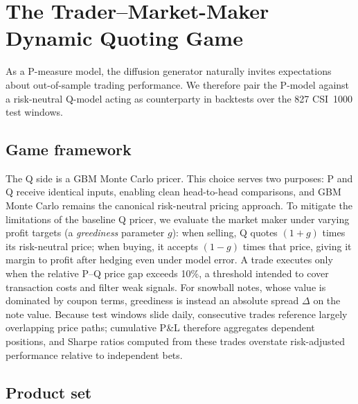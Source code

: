 \documentclass[12pt,letterpaper]{article}
\begin{document}
\section{The Trader--Market-Maker Dynamic Quoting Game}\label{sec:game}

As a P-measure model, the diffusion generator naturally invites expectations
about out-of-sample trading performance. We therefore pair the P-model
against a risk-neutral Q-model acting as counterparty in backtests over the
827 CSI~1000 test windows.

\subsection{Game framework}

The Q side is a GBM Monte Carlo pricer. This choice serves two purposes:
P and Q receive identical inputs, enabling clean head-to-head comparisons,
and GBM Monte Carlo remains the canonical risk-neutral pricing approach. To
mitigate the limitations of the baseline Q pricer, we evaluate the market
maker under varying profit targets (a \emph{greediness} parameter $g$): when
selling, Q quotes $(1+g)$ times its risk-neutral price; when buying, it
accepts $(1-g)$ times that price, giving it margin to profit after hedging
even under model error. A trade executes only when the relative P--Q price
gap exceeds 10\%, a threshold intended to cover transaction costs and filter
weak signals. For snowball notes, whose value is dominated by coupon terms,
greediness is instead an absolute spread $\Delta$ on the note value. Because
test windows slide daily, consecutive trades reference largely overlapping
price paths; cumulative P\&L therefore aggregates dependent positions, and
Sharpe ratios computed from these trades overstate risk-adjusted
performance relative to independent bets.

\subsection{Product set}
\end{document}
